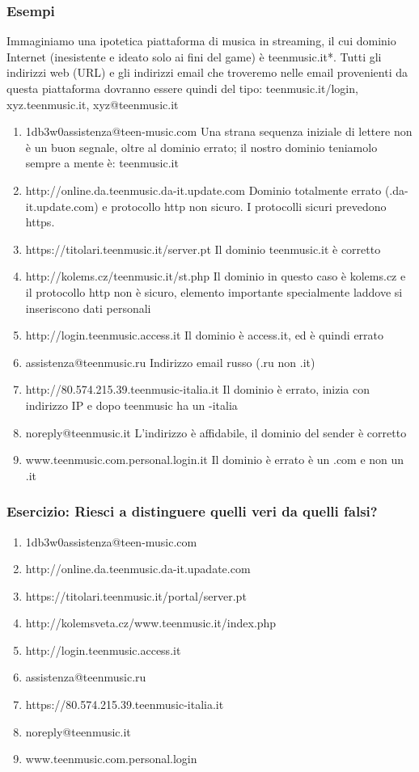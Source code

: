 \documentclass{article}
\begin{document}
\subsubsection{Esempi}
Immaginiamo una ipotetica piattaforma di musica in streaming, il cui dominio Internet (inesistente e ideato solo ai fini del game) è teenmusic.it*.
Tutti gli indirizzi web (URL) e gli indirizzi email che troveremo nelle email provenienti da questa piattaforma dovranno essere quindi del tipo: teenmusic.it/login, xyz.teenmusic.it, xyz@teenmusic.it\\
\begin{enumerate}
	\item 1db3w0assistenza@teen-music.com
	\subitem Una strana sequenza iniziale di lettere non è un buon segnale, oltre al dominio errato; il nostro dominio teniamolo sempre a mente è: teenmusic.it
	\item http://online.da.teenmusic.da-it.update.com
	\subitem Dominio totalmente errato (.da-it.update.com) e protocollo http non sicuro. I protocolli sicuri prevedono https.
	\item https://titolari.teenmusic.it/server.pt
	\subitem Il dominio teenmusic.it è corretto
	\item http://kolems.cz/teenmusic.it/st.php
	\subitem Il dominio in questo caso è kolems.cz e il protocollo http non è sicuro, elemento importante specialmente laddove si inseriscono dati personali
	\item http://login.teenmusic.access.it
	\subitem Il dominio è access.it, ed è quindi errato
	\item assistenza@teenmusic.ru
	\subitem Indirizzo email russo (.ru non .it)
	\item http://80.574.215.39.teenmusic-italia.it
	\subitem Il dominio è errato, inizia con indirizzo IP e dopo teenmusic ha un -italia
	\item noreply@teenmusic.it
	\subitem L’indirizzo è affidabile, il dominio del sender è corretto
	\item www.teenmusic.com.personal.login.it
	\subitem Il dominio è errato è un .com e non un .it
\end{enumerate}
\subsubsection{Esercizio: Riesci a distinguere quelli veri da quelli falsi?}
\label{sec:Caso8}
\begin{enumerate}
	\item 1db3w0assistenza@teen-music.com		
	\item http://online.da.teenmusic.da-it.upadate.com		
	\item https://titolari.teenmusic.it/portal/server.pt		
	\item http://kolemsveta.cz/www.teenmusic.it/index.php		
	\item http://login.teenmusic.access.it		
	\item assistenza@teenmusic.ru		
	\item https://80.574.215.39.teenmusic-italia.it		
	\item noreply@teenmusic.it		
	\item www.teenmusic.com.personal.login
\end{enumerate}
\end{document}
